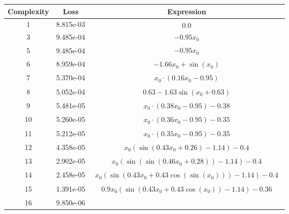 \begin{center}
        \begin{tabular}{|c|c|c|}
        \hline
        Complexity & Loss & Expression \\
        \hline
        1 & 8.815e-03 & $\begin{aligned}0.0\end{aligned}$\\ \hline3 & 9.485e-04 & $\begin{aligned}- 0.95 x_{0}\end{aligned}$\\ \hline5 & 9.485e-04 & $\begin{aligned}- 0.95 x_{0}\end{aligned}$\\ \hline6 & 8.959e-04 & $\begin{aligned}- 1.66 x_{0} + \sin{\left(x_{0} \right)}\end{aligned}$\\ \hline7 & 5.370e-04 & $\begin{aligned}x_{0} \cdot \left(0.16 x_{0} - 0.95\right)\end{aligned}$\\ \hline8 & 5.052e-04 & $\begin{aligned}0.63 - 1.63 \sin{\left(x_{0} + 0.63 \right)}\end{aligned}$\\ \hline9 & 5.481e-05 & $\begin{aligned}x_{0} \cdot \left(0.38 x_{0} - 0.95\right) - 0.38\end{aligned}$\\ \hline10 & 5.260e-05 & $\begin{aligned}x_{0} \cdot \left(0.36 x_{0} - 0.95\right) - 0.35\end{aligned}$\\ \hline11 & 5.212e-05 & $\begin{aligned}x_{0} \cdot \left(0.35 x_{0} - 0.95\right) - 0.35\end{aligned}$\\ \hline12 & 4.358e-05 & $\begin{aligned}x_{0} \left(\sin{\left(0.43 x_{0} + 0.26 \right)} - 1.14\right) - 0.4\end{aligned}$\\ \hline13 & 2.902e-05 & $\begin{aligned}x_{0} \left(\sin{\left(\sin{\left(0.46 x_{0} + 0.28 \right)} \right)} - 1.14\right) - 0.4\end{aligned}$\\ \hline14 & 2.458e-05 & $\begin{aligned}x_{0} \left(\sin{\left(0.43 x_{0} + 0.43 \cos{\left(\sin{\left(x_{0} \right)} \right)} \right)} - 1.14\right) - 0.4\end{aligned}$\\ \hline15 & 1.391e-05 & $\begin{aligned}0.9 x_{0} \left(\sin{\left(0.43 x_{0} + 0.43 \cos{\left(x_{0} \right)} \right)} - 1.14\right) - 0.36\end{aligned}$\\ \hline16 & 9.850e-06 & 
\end{tabular}
\end{center}
